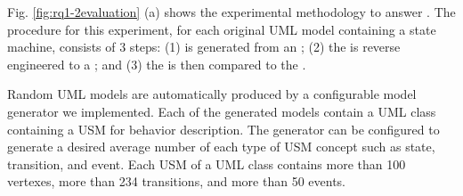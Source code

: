 Fig. \ref{fig:rq1-2evaluation} (a) shows the experimental methodology to answer . 
The procedure for this experiment, for each original UML model containing a state machine, consists of 3 steps: (1)  is generated from an ; (2) the  is reverse engineered to a ; and (3) the  is then compared to the .

Random UML models are automatically produced by a configurable model generator we implemented.
Each of the generated models contain a UML class containing a USM for behavior description. 
The generator can be
configured to generate a desired average number of each type
of USM concept such as state, transition, and event. 
Each USM of a UML class contains more than 100 vertexes, more than 234 transitions, and more than 50 events. 


